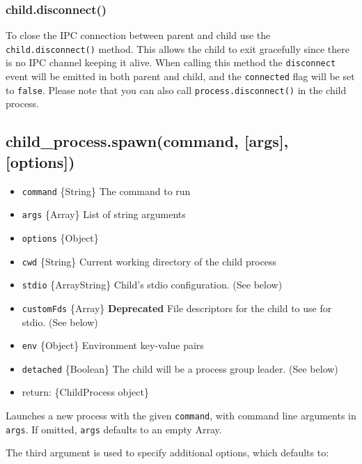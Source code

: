 \subsubsection{child.disconnect()}

To close the IPC connection between parent and child use the
\texttt{child.disconnect()} method. This allows the child to exit
gracefully since there is no IPC channel keeping it alive. When calling
this method the \texttt{disconnect} event will be emitted in both parent
and child, and the \texttt{connected} flag will be set to
\texttt{false}. Please note that you can also call
\texttt{process.disconnect()} in the child process.

\subsection{child\_process.spawn(command, {[}args{]}, {[}options{]})}

\begin{itemize}
\item
  \texttt{command} \{String\} The command to run
\item
  \texttt{args} \{Array\} List of string arguments
\item
  \texttt{options} \{Object\}
\item
  \texttt{cwd} \{String\} Current working directory of the child process
\item
  \texttt{stdio} \{Array\textbar{}String\} Child's stdio configuration.
  (See below)
\item
  \texttt{customFds} \{Array\} \textbf{Deprecated} File descriptors for
  the child to use for stdio. (See below)
\item
  \texttt{env} \{Object\} Environment key-value pairs
\item
  \texttt{detached} \{Boolean\} The child will be a process group
  leader. (See below)
\item
  return: \{ChildProcess object\}
\end{itemize}

Launches a new process with the given \texttt{command}, with command
line arguments in \texttt{args}. If omitted, \texttt{args} defaults to
an empty Array.

The third argument is used to specify additional options, which defaults
to:

\begin{Shaded}
\begin{Highlighting}[]
\NormalTok{\{ }
  \NormalTok{: }
\NormalTok{\}}
\end{Highlighting}
\end{Shaded}

